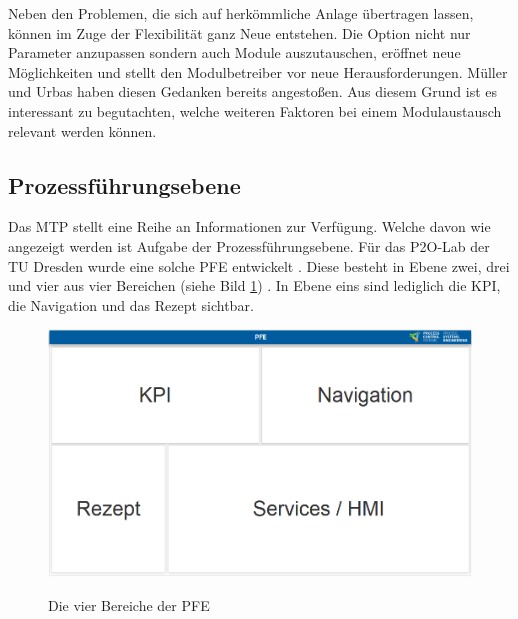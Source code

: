 Neben den Problemen, die sich auf herkömmliche Anlage übertragen lassen, können im Zuge der Flexibilität ganz Neue entstehen. Die Option nicht nur Parameter anzupassen sondern auch Module auszutauschen, eröffnet neue Möglichkeiten und stellt den Modulbetreiber vor neue Herausforderungen. Müller und Urbas \cite{Muller2017} haben diesen Gedanken bereits angestoßen. Aus diesem Grund ist es interessant zu begutachten, welche weiteren Faktoren bei einem Modulaustausch relevant werden können.

\subsection{Prozessführungsebene}
\label{3:PFE}
Das MTP stellt eine Reihe an Informationen zur Verfügung. Welche davon wie angezeigt werden ist Aufgabe der Prozessführungsebene. Für das P2O-Lab der TU Dresden wurde eine solche PFE entwickelt . Diese besteht in Ebene zwei, drei und vier aus vier Bereichen (siehe Bild \ref{pic:Bereiche-PFE}) . In Ebene eins sind lediglich die KPI, die Navigation und das Rezept sichtbar.
\begin{figure}[htbp]
\centering
\includegraphics[scale=0.25]{DA_files/Bilder/Analyse/PFE-Bereiche.png}
\label{pic:Bereiche-PFE}
\caption{Die vier Bereiche der PFE}
\end{figure}

